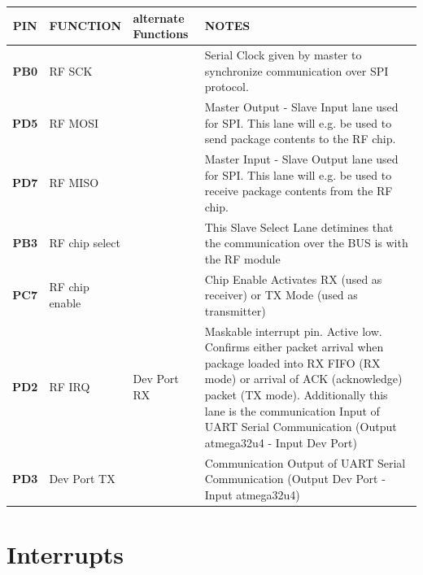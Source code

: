 \documentclass[12pt]{article}
\begin{document}
\small
\begin{tabular}{| c || p{30mm} | p{30mm} | p{60mm} |}
  \hline
  \textbf{PIN} & FUNCTION & alternate Functions & NOTES\\
  \hline
  \hline
  \textbf{PB0} & RF SCK &  & Serial Clock given by master to synchronize communication over SPI protocol. \\
  \hline
  \textbf{PD5} & RF MOSI &  & Master Output - Slave Input lane used for SPI. This lane will e.g. be used to send package contents to the RF chip.\\
  \hline
  \textbf{PD7} & RF MISO &  & Master Input - Slave Output lane used for SPI. This lane will e.g. be used to receive package contents from the RF chip.\\
  \hline
  \textbf{PB3} & RF chip select &  & This Slave Select Lane detimines that the communication over the BUS is with the RF module\\
  \hline
  \textbf{PC7} & RF chip enable &  & Chip Enable Activates RX (used as receiver) or TX Mode (used as transmitter) \\
  \hline
  \textbf{PD2} & RF IRQ & Dev Port RX & Maskable interrupt pin. Active low. Confirms either packet arrival when package loaded into RX FIFO (RX mode) or arrival of ACK (acknowledge) packet (TX mode). Additionally this lane is the communication Input of UART Serial Communication (Output atmega32u4 - Input Dev Port) \\
  \hline
  \textbf{PD3} & Dev Port TX &  & Communication Output of UART Serial Communication (Output Dev Port - Input atmega32u4) \\
  \hline
\end{tabular}
\normalsize

\newpage
\section*{Interrupts}
\end{document}
